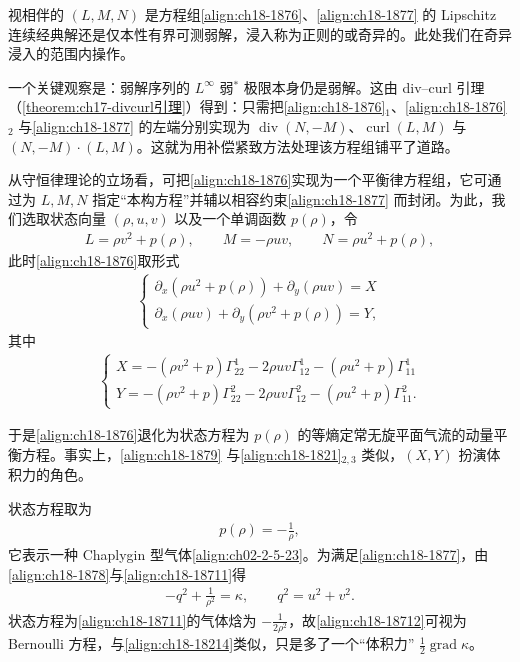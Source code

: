 \documentclass[../../main.tex]{subfiles}
\begin{document}
视相伴的 $(L,M,N)$ 是方程组\eqref{align:ch18-1876}、\eqref{align:ch18-1877} 的 Lipschitz 连续经典解还是仅本性有界可测弱解，浸入称为正则的或奇异的。此处我们在奇异浸入的范围内操作。

一个关键观察是：弱解序列的 $L^\infty$ 弱$^*$ 极限本身仍是弱解。这由 div--curl 引理（\cref{theorem:ch17-divcurl引理}）得到：只需把\eqref{align:ch18-1876}$_1$、\eqref{align:ch18-1876}$_2$ 与\eqref{align:ch18-1877} 的左端分别实现为 $\operatorname{div}(N,-M)$、$\operatorname{curl}(L,M)$ 与 $(N,-M)\cdot(L,M)$。这就为用补偿紧致方法处理该方程组铺平了道路。

从守恒律理论的立场看，可把\eqref{align:ch18-1876}实现为一个平衡律方程组，它可通过为 $L,M,N$ 指定“本构方程”并辅以相容约束\eqref{align:ch18-1877} 而封闭。为此，我们选取状态向量 $(\rho,u,v)$ 以及一个单调函数 $p(\rho)$，令
\begin{align}
L=\rho v^2+p(\rho),\qquad M=-\rho uv,\qquad N=\rho u^2+p(\rho),
\label{align:ch18-1878}
\end{align}
此时\eqref{align:ch18-1876}取形式
\begin{align}
\begin{cases}
\partial_x(\rho u^2+p(\rho))+\partial_y(\rho uv)=X\\
\partial_x(\rho uv)+\partial_y(\rho v^2+p(\rho))=Y,
\end{cases}
\label{align:ch18-1879}
\end{align}
其中
\begin{align}
\begin{cases}
X=-(\rho v^2+p)\Gamma_{22}^1-2\rho uv\Gamma_{12}^1-(\rho u^2+p)\Gamma_{11}^1\\
Y=-(\rho v^2+p)\Gamma_{22}^2-2\rho uv\Gamma_{12}^2-(\rho u^2+p)\Gamma_{11}^2.
\end{cases}
\label{align:ch18-18710}
\end{align}

于是\eqref{align:ch18-1876}退化为状态方程为 $p(\rho)$ 的等熵定常无旋平面气流的动量平衡方程。事实上，\eqref{align:ch18-1879} 与\eqref{align:ch18-1821}$_{2,3}$ 类似，$(X,Y)$ 扮演体积力的角色。

状态方程取为
\begin{align}
p(\rho)=-\frac1\rho,
\label{align:ch18-18711}
\end{align}
它表示一种 Chaplygin 型气体\eqref{align:ch02-2-5-23}。为满足\eqref{align:ch18-1877}，由\eqref{align:ch18-1878}与\eqref{align:ch18-18711}得
\begin{align}
-q^2+\frac{1}{\rho^2}=\kappa,\qquad q^2=u^2+v^2.
\label{align:ch18-18712}
\end{align}
状态方程为\eqref{align:ch18-18711}的气体焓为 $-\frac{1}{2\rho^2}$，故\eqref{align:ch18-18712}可视为 Bernoulli 方程，与\eqref{align:ch18-18214}类似，只是多了一个“体积力” $\frac12\operatorname{grad}\kappa$。
\end{document}
